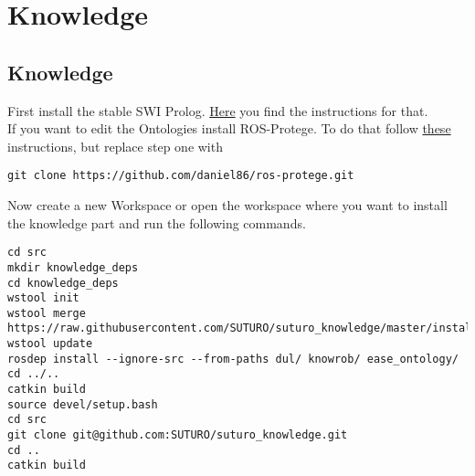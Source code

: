 \documentclass[main.tex]{subfiles}
\begin{document}
\section{Knowledge}
\subsection{Knowledge}
First install the stable SWI Prolog. \href{https://www.swi-prolog.org/build/PPA.html}{Here} you find the instructions for that.\\
If you want to edit the Ontologies install ROS-Protege. To do that follow \href{https://github.com/protegeproject/protege/wiki/Building-from-Source}{these} instructions, but replace step one with
\begin{lstlisting}
git clone https://github.com/daniel86/ros-protege.git \end{lstlisting}

Now create a new Workspace or open the workspace where you want to install the knowledge part and run the following commands.
\begin{lstlisting}
cd src
mkdir knowledge_deps
cd knowledge_deps
wstool init
wstool merge https://raw.githubusercontent.com/SUTURO/suturo_knowledge/master/install.rosinstall
wstool update
rosdep install --ignore-src --from-paths dul/ knowrob/ ease_ontology/
cd ../..
catkin build
source devel/setup.bash
cd src
git clone git@github.com:SUTURO/suturo_knowledge.git
cd ..
catkin build  \end{lstlisting}
\end{document}
